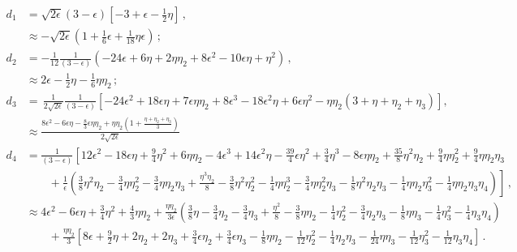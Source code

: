 \documentclass[prd, onecolumn, floatfix, letterpaper, nofootinbib, amsmath, amssymb, superscriptaddress]{revtex4}
\renewcommand{\(}{\left(}
\renewcommand{\)}{\right)}
\renewcommand{\[}{\left[}
\renewcommand{\]}{\right]}
\begin{document}
\begin{align}
\label{eq:Gamma1}
	d_1&=\sqrt{2\epsilon}{(3-\epsilon)}\left[ -3+\epsilon-\frac{1}{2}\eta \right]\, ,\nonumber\\
		& \approx -\sqrt{2\epsilon}\left(1+\frac{1}{6}\epsilon+\frac{1}{18}\eta\epsilon \right)\, ;\\
	d_2&= -\frac{1}{12}\frac{1}{(3-\epsilon)}\left(-24\epsilon+6\eta+2\eta\eta_2+8\epsilon^2 -10\epsilon\eta+\eta^2\right)\, ,\nonumber\\
		&\approx 2\epsilon-\frac{1}{2}\eta-\frac{1}{6}\eta\eta_2\, ;\\
	d_3&=\, \frac{1}{2\sqrt{2\epsilon}} \frac{1}{(3-\epsilon)}\left[ -24\epsilon^2 +18\epsilon\eta +7\epsilon\eta\eta_2+8\epsilon^3-18\epsilon^2\eta+6\epsilon\eta^2-\eta\eta_2\left(3+\eta+\eta_2+\eta_3 \right)\right] ,\nonumber\\
		&\approx \frac{8\epsilon^2-6\epsilon\eta-\frac{8}{3}\epsilon\eta\eta_2+\eta\eta_2\left(1+\frac{\eta+\eta_2+\eta_3}{3} \right)}{2\sqrt{2\epsilon}}\\
	d_4&=\frac{1}{(3-\epsilon)}\left[12\epsilon^2-18\epsilon\eta+\frac{9}{4}\eta^2 +6\eta\eta_2-4\epsilon^3+14\epsilon^2\eta-\frac{39}{4}\epsilon\eta^2   +\frac{3}{4}\eta^3 -8\epsilon\eta\eta_2+\frac{35}{8}\eta^2\eta_2+\frac{9}{4}\eta\eta_2^2+\frac{9}{4}\eta\eta_2\eta_3\right.\nonumber\\
	& \qquad +\frac{1}{\epsilon}\left.\left( \frac{3}{8}\eta^2\eta_2-\frac{3}{4}\eta\eta^2_2-\frac{3}{4}\eta\eta_2\eta_3 +\frac{\eta^3\eta_2}{8}-\frac{3}{8}\eta^2\eta_2^2-\frac{1}{4}\eta\eta_2^3-\frac{3}{4}\eta\eta_2^2\eta_3-\frac{1}{8}\eta^2\eta_2\eta_3-\frac{1}{4}\eta\eta_2\eta_3^2-\frac{1}{4}\eta\eta_2\eta_3\eta_4\right)\right]
	\, , \\
		&\approx 4\epsilon^2-6\epsilon\eta+\frac{3}{4}\eta^2+\frac{4}{3}\eta\eta_2+
		\frac{\eta\eta_2}{3\epsilon}\left( \frac{3}{8}\eta-\frac{3}{4}\eta_2-\frac{3}{4}\eta_3 +\frac{\eta^2}{8}-\frac{3}{8}\eta\eta_2-\frac{1}{4}\eta_2^2-\frac{3}{4}\eta_2\eta_3-\frac{1}{8}\eta\eta_3-\frac{1}{4}\eta_3^2-\frac{1}{4}\eta_3\eta_4\right)\nonumber\\
		&\qquad+\frac{\eta\eta_2}{3}\left[ 8\epsilon+\frac{9}{2}\eta+2\eta_2+2\eta_3+\frac{3}{4}\epsilon\eta_2+\frac{3}{4}\epsilon\eta_3-\frac{1}{8}\eta\eta_2-\frac{1}{12}\eta_2^2-\frac{1}{4}\eta_2\eta_3-\frac{1}{24}\eta\eta_3-\frac{1}{12}\eta_3^2-\frac{1}{12}\eta_3\eta_4
		  \right] \, .
		  \label{eq:d4}%
\end{align}
\end{document}
